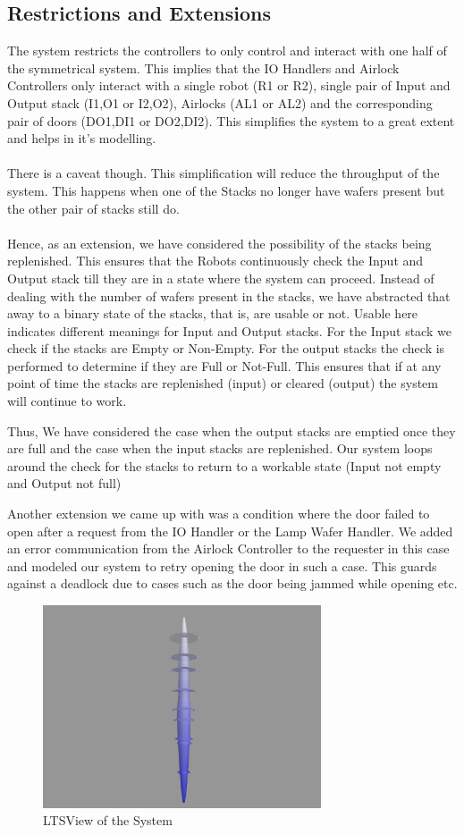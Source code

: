 \documentclass[a4paper,12pt]{article}
\begin{document}
	\subsection{Restrictions and Extensions}
	The system restricts the controllers to only control and interact with one half of the symmetrical system. This implies that the IO Handlers and Airlock Controllers only interact with a single robot (R1 or R2), single pair of Input and Output stack (I1,O1 or I2,O2), Airlocks (AL1 or AL2) and the corresponding pair of doors (DO1,DI1 or DO2,DI2). This simplifies the system to a great extent and helps in it's modelling.
	\\
	\\There is a caveat though. This simplification will reduce the throughput of the system. This happens when one of the Stacks no longer have wafers present but the other pair of stacks still do. 
	\\
	\\Hence, as an extension, we have considered the possibility of the stacks being replenished. This ensures that the Robots continuously check the Input and Output stack till they are in a state where the system can proceed. Instead of dealing with the number of wafers present in the stacks, we have abstracted that away to a binary state of the stacks, that is, are usable or not. Usable here indicates different meanings for Input and Output stacks. For the Input stack we check if the stacks are Empty or Non-Empty. For the output stacks the check is performed to determine if they are Full or Not-Full. This ensures that if at any point of time the stacks are replenished (input) or cleared (output) the system will continue to work. 
	\par Thus, We have considered the case when the output stacks are emptied once they are full and the case when the input stacks are replenished. Our system loops around the check for the stacks to return to a workable state (Input not empty and Output not full)	
	\par Another extension we came up with was a condition where the door failed to open after a  request from the IO Handler or the Lamp Wafer Handler. We added an error communication from the Airlock Controller to the requester in this case and modeled our system to retry opening the door in such a case. This guards against a deadlock due to cases such as the door being jammed while opening etc.
	\\
	\begin{figure}[ht]
		\centering
		\includegraphics[width=\textwidth, height=6cm]{3D-Model.png}
		\caption{LTSView of the System}
		\label{fig:ltsview}
	\end{figure}
	\newpage
\end{document}
